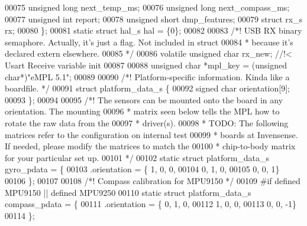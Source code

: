 \begin{DoxyCode}
00075     \textcolor{keywordtype}{unsigned} \textcolor{keywordtype}{long} next_temp_ms;
00076     \textcolor{keywordtype}{unsigned} \textcolor{keywordtype}{long} next_compass_ms;
00077     \textcolor{keywordtype}{unsigned} \textcolor{keywordtype}{int} report;
00078     \textcolor{keywordtype}{unsigned} \textcolor{keywordtype}{short} dmp_features;
00079     \textcolor{keyword}{struct} rx_s rx;
00080 \};
00081 \textcolor{keyword}{static} \textcolor{keyword}{struct} hal_s hal = \{0\};
00082 
00083 \textcolor{comment}{/*! USB RX binary semaphore. Actually, it's just a flag. Not included in struct}
00084 \textcolor{comment}{ * because it's declared extern elsewhere.}
00085 \textcolor{comment}{ */}
00086 \textcolor{keyword}{volatile} \textcolor{keywordtype}{unsigned} \textcolor{keywordtype}{char} rx_new; \textcolor{comment}{//!< Usart Receive variable init}
00087 
00088 \textcolor{keywordtype}{unsigned} \textcolor{keywordtype}{char} *mpl_key = (\textcolor{keywordtype}{unsigned} \textcolor{keywordtype}{char}*)\textcolor{stringliteral}{"eMPL 5.1"};
00089 
00090 \textcolor{comment}{/*! Platform-specific information. Kinda like a boardfile. */}
00091 \textcolor{keyword}{struct} platform_data_s \{
00092     \textcolor{keywordtype}{signed} \textcolor{keywordtype}{char} orientation[9];
00093 \};
00094 
00095 \textcolor{comment}{/*! The sensors can be mounted onto the board in any orientation. The mounting}
00096 \textcolor{comment}{ * matrix seen below tells the MPL how to rotate the raw data from the}
00097 \textcolor{comment}{ * driver(s).}
00098 \textcolor{comment}{ * TODO: The following matrices refer to the configuration on internal test}
00099 \textcolor{comment}{ * boards at Invensense. If needed, please modify the matrices to match the}
00100 \textcolor{comment}{ * chip-to-body matrix for your particular set up.}
00101 \textcolor{comment}{ */}
00102 \textcolor{keyword}{static} \textcolor{keyword}{struct} platform_data_s gyro_pdata = \{
00103     .orientation = \{ 1, 0, 0,
00104                      0, 1, 0,
00105                      0, 0, 1\}
00106 \};
00107 
00108 \textcolor{comment}{/*! Compass calibration for MPU9150 */}
00109 \textcolor{preprocessor}{#}\textcolor{preprocessor}{if} \textcolor{preprocessor}{defined} \textcolor{preprocessor}{MPU9150} \textcolor{preprocessor}{||} \textcolor{preprocessor}{defined} \textcolor{preprocessor}{MPU9250}
00110 \textcolor{keyword}{static} \textcolor{keyword}{struct} platform\_data\_s compass\_pdata = \{
00111     .orientation = \{ 0, 1, 0,
00112                      1, 0, 0,
00113                      0, 0, -1\}
00114 \};

\end{DoxyCode}
